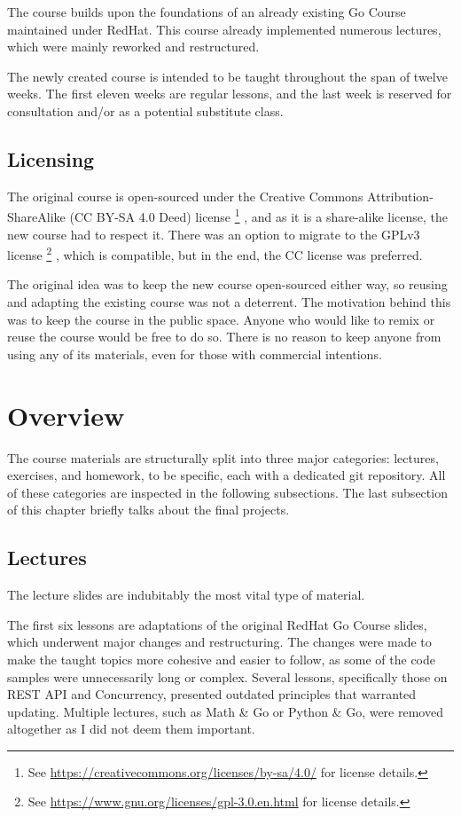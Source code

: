 \documentclass[
  digital,
  color,
  oneside,
  nosansbold,
  nocolorbold,
  lof,
  lot,
]{fithesis4}
\begin{document}
The course builds upon the foundations of an already existing Go Course maintained under RedHat\cite{redhat-go-course}. This course already implemented numerous lectures, which were mainly reworked and restructured.

The newly created course is intended to be taught throughout the span of twelve weeks. The first eleven weeks are regular lessons, and the last week is reserved for consultation and/or as a potential substitute class.

\subsection{Licensing}

The original course is open-sourced under the Creative Commons Attribution-ShareAlike (CC BY-SA 4.0 Deed) license
\footnote{See \url{https://creativecommons.org/licenses/by-sa/4.0/} for license details.}
, and as it is a share-alike license, the new course had to respect it. There was an option to migrate to the GPLv3 license
\footnote{See \url{https://www.gnu.org/licenses/gpl-3.0.en.html} for license details.}
, which is compatible, but in the end, the CC license was preferred.

The original idea was to keep the new course open-sourced either way, so reusing and adapting the existing course was not a deterrent. The motivation behind this was to keep the course in the public space. Anyone who would like to remix or reuse the course would be free to do so. There is no reason to keep anyone from using any of its materials, even for those with commercial intentions.

\section{Overview}

The course materials are structurally split into three major categories: lectures, exercises, and homework, to be specific, each with a dedicated git repository. All of these categories are inspected in the following subsections. The last subsection of this chapter briefly talks about the final projects.

\subsection{Lectures}

The lecture slides are indubitably the most vital type of material. 

The first six lessons are adaptations of the original RedHat Go Course slides, which underwent major changes and restructuring. The changes were made to make the taught topics more cohesive and easier to follow, as some of the code samples were unnecessarily long or complex. Several lessons, specifically those on REST API and Concurrency, presented outdated principles that warranted updating. Multiple lectures, such as Math \& Go or Python \& Go, were removed altogether as I did not deem them important.
\end{document}
